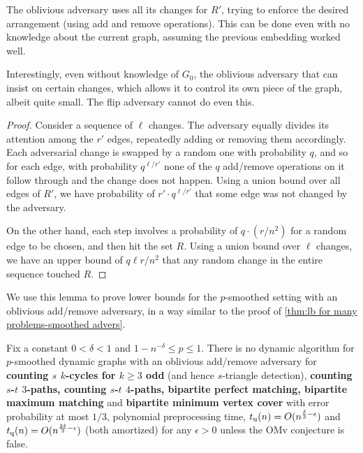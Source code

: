 \documentclass[letter,11pt]{article}
\newcommand{\omv}{\textnormal{\textsf{OMv}}\xspace}
\newcommand{\paths}[3]{${#1}$-${#2}$ ${#3}$-paths\xspace}
\newcommand{\tu}{t_{\textnormal{u}}}
\newcommand{\tq}{t_{\textnormal{q}}}
\begin{document}
The oblivious adversary uses all its changes for $R'$, trying to enforce the desired arrangement (using add and remove operations). This can be done even with no knowledge about the current graph, assuming the previous embedding worked well.

Interestingly, even without knowledge of $G_0$, the oblivious adversary that can insist on certain changes, which allows it to control its own piece of the graph, albeit quite small. 
The flip adversary cannot do even this.

\begin{proof}
    Consider a sequence of $\ell $ changes.
    The adversary equally divides its attention among the $r'$ edges, repeatedly adding or removing them accordingly.
    Each adversarial change is swapped by a random one with probability $q$, and so for each edge, with probability $q^{\ell/r'}$ none of the $q$ add/remove operations on it follow through and the change does not happen.
    Using a union bound over all edges of $R'$, we have probability of $r'\cdot q^{\ell/r'}$ that some edge was not changed by the adversary.

    On the other hand, each step involves a probability of $q \cdot (r/n^2)$ for a random edge to be chosen, and then hit the set $R$. 
    Using a union bound over $\ell$ changes, we have an upper bound of $q\ell r/n^2$ that any random change in the entire sequence touched $R$.
\end{proof}


We use this lemma to prove lower bounds for the $p$-smoothed setting with an oblivious add/remove adversary, in a way similar to the proof of \cref{thm:lb for many problems-smoothed advers}.

\begin{theorem}
	\label{thm:lb for many problems-smoothed oblivious ar}
	Fix a constant $0<\delta<1$ and $1-n^{-\delta} \leq p \leq 1$. 
	There is no dynamic algorithm for
	$p$-smoothed dynamic graphs with an              oblivious add/remove adversary
	for 
	\textbf{%
		counting $s$ $k$-cycles for $k\geq 3$ odd} (and hence $s$-triangle detection),
	\textbf{%
		counting \paths{s}{t}{3},
		counting \paths{s}{t}{4},
		bipartite perfect matching,
		bipartite maximum matching} 
	and 
	\textbf{bipartite minimum vertex cover} 
	with error probability at most $1/3$,
	polynomial preprocessing time,
	$\tu(n)=O(n^{\frac{\delta}{3}-\epsilon})$
	and
	$\tq(n)
	=O(n^{\frac{2\delta}{3}-\epsilon})$
	(both amortized)
	for any $\epsilon>0$ 
	unless the \omv conjecture is false.	
\end{theorem}
\end{document}
